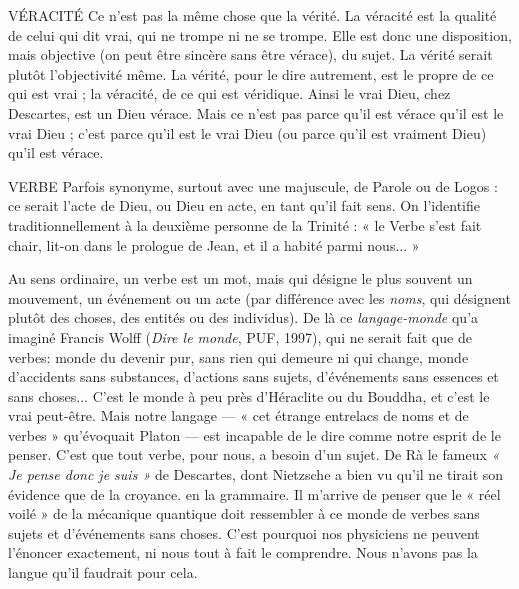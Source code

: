 VÉRACITÉ Ce n’est pas la même chose que la vérité. La véracité est la qualité
de celui qui dit vrai, qui ne trompe ni ne se trompe. Elle est
donc une disposition, mais objective (on peut être sincère sans être vérace), du
sujet. La vérité serait plutôt l’objectivité même. La vérité, pour le dire autrement,
est le propre de ce qui est vrai ; la véracité, de ce qui est véridique. Ainsi
le vrai Dieu, chez Descartes, est un Dieu vérace. Mais ce n’est pas parce qu’il
est vérace qu’il est le vrai Dieu ; c’est parce qu’il est le vrai Dieu (ou parce qu’il
est vraiment Dieu) qu’il est vérace.

VERBE Parfois synonyme, surtout avec une majuscule, de Parole ou de Logos :
ce serait l’acte de Dieu, ou Dieu en acte, en tant qu’il fait sens. On
l’identifie traditionnellement à la deuxième personne de la Trinité : « le Verbe
s’est fait chair, lit-on dans le prologue de Jean, et il a habité parmi nous... »

Au sens ordinaire, un verbe est un mot, mais qui désigne le plus souvent un
mouvement, un événement ou un acte (par différence avec les {\it noms}, qui
désignent plutôt des choses, des entités ou des individus). De là ce {\it langage-monde} 
qu'a imaginé Francis Wolff ({\it Dire le monde}, PUF, 1997), qui ne serait
fait que de verbes: monde du devenir pur, sans rien qui demeure ni qui
change, monde d’accidents sans substances, d’actions sans sujets, d'événements
sans essences et sans choses... C’est le monde à peu près d'Héraclite ou du
Bouddha, et c’est le vrai peut-être. Mais notre langage — « cet étrange entrelacs
de noms et de verbes » qu’évoquait Platon — est incapable de le dire comme
notre esprit de le penser. C’est que tout verbe, pour nous, a besoin d’un sujet.
De Rà le fameux {\it « Je pense donc je suis »} de Descartes, dont Nietzsche a bien vu
qu'il ne tirait son évidence que de la croyance. en la grammaire. Il m'arrive
de penser que le « réel voilé » de la mécanique quantique doit ressembler à ce
monde de verbes sans sujets et d’événements sans choses. C’est pourquoi nos
physiciens ne peuvent l’énoncer exactement, ni nous tout à fait le comprendre.
Nous n'avons pas la langue qu’il faudrait pour cela.

